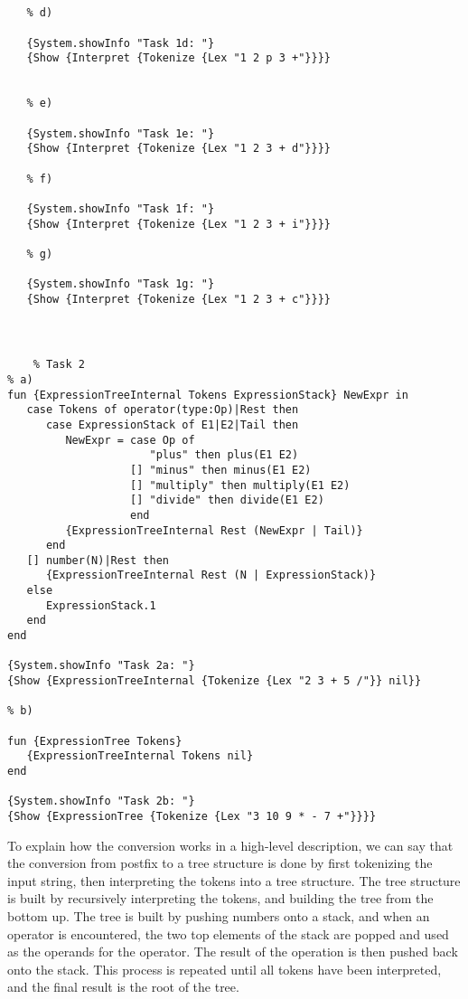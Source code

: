 \documentclass[11pt,a4paper]{report}
\begin{document}
\begin{lstlisting}[language=Oz]
   
   
   % d)
   
   {System.showInfo "Task 1d: "}
   {Show {Interpret {Tokenize {Lex "1 2 p 3 +"}}}}
   
   
   % e)
   
   {System.showInfo "Task 1e: "}
   {Show {Interpret {Tokenize {Lex "1 2 3 + d"}}}}
   
   % f)
   
   {System.showInfo "Task 1f: "}
   {Show {Interpret {Tokenize {Lex "1 2 3 + i"}}}}
   
   % g)
   
   {System.showInfo "Task 1g: "}
   {Show {Interpret {Tokenize {Lex "1 2 3 + c"}}}}
   
\end{lstlisting}


\section{}
\begin{lstlisting}
    % Task 2
% a)
fun {ExpressionTreeInternal Tokens ExpressionStack} NewExpr in
   case Tokens of operator(type:Op)|Rest then
      case ExpressionStack of E1|E2|Tail then
         NewExpr = case Op of
                      "plus" then plus(E1 E2)
                   [] "minus" then minus(E1 E2)
                   [] "multiply" then multiply(E1 E2)
                   [] "divide" then divide(E1 E2)
                   end
         {ExpressionTreeInternal Rest (NewExpr | Tail)}
      end
   [] number(N)|Rest then
      {ExpressionTreeInternal Rest (N | ExpressionStack)}
   else
      ExpressionStack.1
   end
end

{System.showInfo "Task 2a: "}
{Show {ExpressionTreeInternal {Tokenize {Lex "2 3 + 5 /"}} nil}}

% b)

fun {ExpressionTree Tokens}
   {ExpressionTreeInternal Tokens nil}
end

{System.showInfo "Task 2b: "}
{Show {ExpressionTree {Tokenize {Lex "3 10 9 * - 7 +"}}}}
\end{lstlisting}

To explain how the conversion works in a high-level description, we can say that the conversion from postfix to a tree structure is done by first tokenizing the input string, then interpreting the tokens into a tree structure. The tree structure is built by recursively interpreting the tokens, and building the tree from the bottom up. The tree is built by pushing numbers onto a stack, and when an operator is encountered, the two top elements of the stack are popped and used as the operands for the operator. The result of the operation is then pushed back onto the stack. This process is repeated until all tokens have been interpreted, and the final result is the root of the tree.
\end{document}
